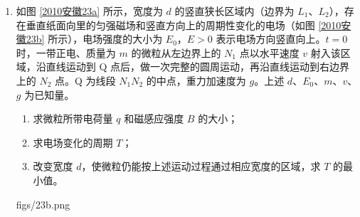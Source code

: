 \documentclass[\gkver]{gaokaozhenti}
\begin{document}
\begin{enumerate}
{联立③⑥得：$F=\mu mg+ma_{1}=6\UN$

（3）解法一：由匀变速运动的位移公式得：

$x=x_{1}+x_{2}=v_{10}\Delta t_{1}+\frac{1}{2}a_{1}\Delta t_{1}^{2}+v_{20}\Delta t_{2}+\frac{1}{2}a_{2}\Delta t_{2}^{2}=46\Um$

解法二：根据 $v-t$ 图像围成的面积得：

$x=\left(\frac{v_{10}+v_{1t}}{2}\times\Delta t_{1}+\frac{1}{2}\times v_{20}\times\Delta t_{2}\right)=46\Um$
}

\item
如图 \ref{2010安徽23a} 所示，宽度为 $d$ 的竖直狭长区域内（边界为 $L_{1}$、$L_{2}$），存在垂直纸面向里的匀强磁场和竖直方向上的周期性变化的电场（如图 \ref{2010安徽23b} 所示），电场强度的大小为 $E_{0}$，$E>0$ 表示电场方向竖直向上。$t=0$ 时，一带正电、质量为 $m$ 的微粒从左边界上的 $N_{1}$ 点以水平速度 $v$ 射入该区域，沿直线运动到 Q 点后，做一次完整的圆周运动，再沿直线运动到右边界上的 $N_{2}$ 点。Q 为线段 $N_{1}N_{2}$ 的中点，重力加速度为 $g$。上述 $d$、$E_{0}$、$m$、$v$、$g$ 为已知量。
\begin{enumerate}
	\item
	求微粒所带电荷量 $q$ 和磁感应强度 $B$ 的大小；

	\item
	求电场变化的周期 $T$；

	\item
	改变宽度 $d$，使微粒仍能按上述运动过程通过相应宽度的区域，求 $T$ 的最小值。
\end{enumerate}

{figs/23b.png}

\end{enumerate}
\end{document}
